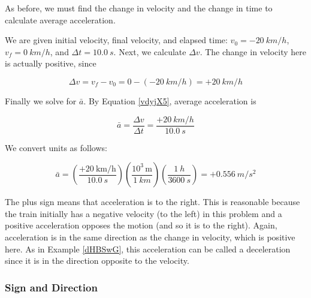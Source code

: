 \documentclass[main-ap-physics.tex]{subfiles}
\begin{document}
As before, we must find the change in velocity and the change in time to calculate average acceleration.

\vspace{1em}

We are given initial velocity, final velocity, and elapsed time: $v_0 = -\SI{20}{km/h}$, $v_f = \SI{0}{km/h}$, and $\Delta t = \SI{10.0}{s}$. Next, we calculate $\Delta v$. The change in velocity here is actually positive, since

\begin{equation*}
    \Delta v = v_f - v_0 = 0 - \left(-\SI{20}{km/h}\right) = +\SI{20}{km/h}
\end{equation*}

Finally we solve for $\bar{a}$. By Equation \ref{vdyjX5}, average acceleration is

\begin{equation*}
    \bar{a} = \frac{\Delta v}{\Delta t} = \frac{+\SI{20}{km/h}}{\SI{10.0}{s}}
\end{equation*}

We convert units as follows:

\begin{equation*}
    \bar{a} = \left(\frac{+\SI[per-mode=fraction]{20}{\kilo\meter\per\hour}}{\SI{10.0}{s}}\right)
        \left(\frac{10^3\,\text{m}}{\SI{1}{km}}\right)\left(\frac{\SI{1}{h}}{\SI{3600}{s}}\right) = +\SI{0.556}{m/s^2}
\end{equation*}

The plus sign means that acceleration is to the right. This is reasonable because the train initially has a negative velocity (to the left) in this problem and a positive acceleration opposes the motion (and so it is to the right). Again, acceleration is in the same direction as the change in velocity, which is positive here. As in Example \ref{dHBSwG}, this acceleration can be called a deceleration since it is in the direction opposite to the velocity.

\endsolution

\subsubsection*{Sign and Direction}
\end{document}
